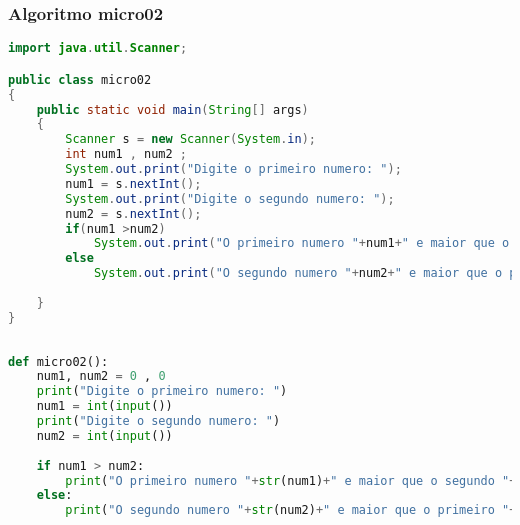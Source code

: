 \documentclass[hidelinks,12pt]{article}
\begin{document}
	\subsubsection{Algoritmo micro02}
	
	\begin{lstlisting}[caption=Código em Java,language=java]
import java.util.Scanner;

public class micro02
{
	public static void main(String[] args)
	{
		Scanner s = new Scanner(System.in);
		int num1 , num2 ;
		System.out.print("Digite o primeiro numero: ");
		num1 = s.nextInt();
		System.out.print("Digite o segundo numero: ");
		num2 = s.nextInt();
		if(num1 >num2)
			System.out.print("O primeiro numero "+num1+" e maior que o segundo "+num2);
		else
			System.out.print("O segundo numero "+num2+" e maior que o primeiro "+num1);
	
	}
}	
	
	\end{lstlisting}
	
	\begin{lstlisting}[caption=Código em python,language=Python]
def micro02():
	num1, num2 = 0 , 0
	print("Digite o primeiro numero: ")
	num1 = int(input())
	print("Digite o segundo numero: ")
	num2 = int(input())
	
	if num1 > num2:
		print("O primeiro numero "+str(num1)+" e maior que o segundo "+str(num2),end="")
	else:
		print("O segundo numero "+str(num2)+" e maior que o primeiro "+str(num1),end="")
	
	
	\end{lstlisting}
	
\end{document}
